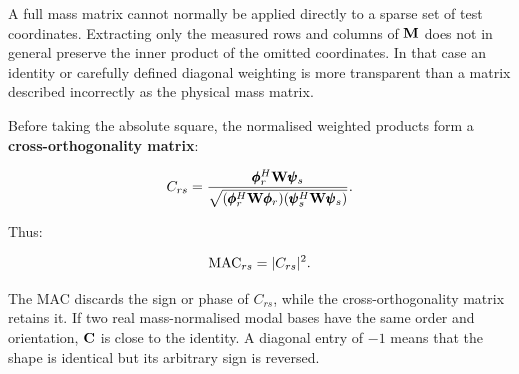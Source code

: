 A full mass matrix cannot normally be applied directly to a sparse set of test
coordinates. Extracting only the measured rows and columns of $\mathbf{M}$ does not
in general preserve the inner product of the omitted coordinates. In that case
an identity or carefully defined diagonal weighting is more transparent than a
matrix described incorrectly as the physical mass matrix.

Before taking the absolute square, the normalised weighted products form a
\textbf{cross-orthogonality matrix}:

\begin{equation}\label{normalised-cross-orthogonality}
    C_{rs}=
    \frac{\pmb{\phi}_r^H\mathbf{W}\pmb{\psi}_s}
    {\sqrt{(\pmb{\phi}_r^H\mathbf{W}\pmb{\phi}_r)
           (\pmb{\psi}_s^H\mathbf{W}\pmb{\psi}_s)}}.
\end{equation}

Thus:

\begin{equation}
    \operatorname{MAC}_{rs}=| {C_{rs}} |^2.
\end{equation}

The MAC discards the sign or phase of $C_{rs}$, while the cross-orthogonality
matrix retains it. If two real mass-normalised modal bases have the same order
and orientation, $\mathbf{C}$ is close to the identity. A diagonal entry of $-1$
means that the shape is identical but its arbitrary sign is reversed.

